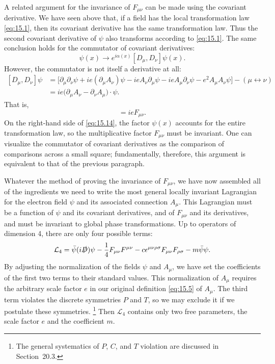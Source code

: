 A related argument for the invariance of $F_{\mu\nu}$ can be made using the
covariant derivative.  We have seen above that, if a field has the local
transformation law \eqref{eq:15.1}, then its covariant derivative has the
same transformation law.  Thus the second covariant derivative of $\psi$ also
transforms according to \eqref{eq:15.1}.  The same conclusion holds for the
commutator of covariant derivatives:
\begin{equation}
  [D_\mu, D_\nu]\psi(x) \to e^{i\alpha(x)}[D_\mu, D_\nu]\psi(x) .
  \label{eq:15.14}
\end{equation}
However, the commutator is not itself a derivative at all:
\begin{equation}
  \begin{aligned}
    [D_\mu, D_\nu]\psi &= \bigl[ \partial_\mu\partial_\nu\psi
      + ie(\partial_\mu A_\nu) \psi - ie A_\nu\partial_\mu\psi
      - ie A_\mu\partial_\nu\psi - e^2A_\mu A_\nu\psi \bigr] - (\mu\leftrightarrow\nu)\\
    &= ie\bigl( \partial_\mu A_\nu - \partial_\nu A_\mu \bigr)\cdot\psi .
  \end{aligned}
  \label{eq:15.16}
\end{equation}
That is,
\begin{equation}
  [D_\mu, D_\nu] = ieF_{\mu\nu} .
\end{equation}
On the right-hand side of \eqref{eq:15.14}, the factor $\psi(x)$ accounts for
the entire transformation law, so the multiplicative factor $F_{\mu\nu}$ must
be invariant.  One can visualize the commutator of covariant derivatives as
the comparison of comparisons across a small square; fundamentally,
therefore, this argument is equivalent to that of the previous paragraph.

Whatever the method of proving the invariance of $F_{\mu\nu}$, we have now
assembled all of the ingredients we need to write the most general locally
invariant Lagrangian for the electron field $\psi$ and its associated
connection $A_\mu$.  This Lagrangian must be a function of $\psi$ and its
covariant derivatives, and of $F_{\mu\nu}$ and its derivatives, and must be
invariant to global phase transformations.  Up to operators of dimension 4,
there are only four possible terms:
\begin{equation}
  \mathcal{L}_4 = \bar{\psi}(i\slashed{D})\psi - \frac{1}{4}F_{\mu\nu}F^{\mu\nu}
    - c\epsilon^{\mu\nu\rho\sigma}F_{\mu\nu}F_{\rho\sigma} - m\bar{\psi}\psi .
  \label{eq:15.17}
\end{equation}
By adjusting the normalization of the fields $\psi$ and $A_\mu$, we have set
the coefficients of the first two terms to their standard values.  This
normalization of $A_\mu$ requires the arbitrary scale factor $e$ in our
original definition \eqref{eq:15.5} of $A_\mu$.  The third term violates the
discrete symmetries $P$ and $T$, so we may exclude it if we postulate these
symmetries.%
\footnote{The general systematics of $P$, $C$, and $T$ violation are discussed
in Section~20.3.}  Then $\mathcal{L}_4$ contains only two free parameters,
the scale factor $e$ and the coefficient $m$.

